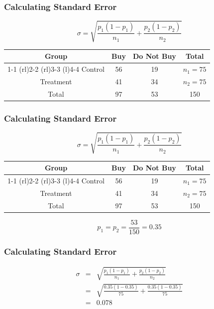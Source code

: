\documentclass{beamer}
\begin{document}
\begin{frame}
  \frametitle{Calculating Standard Error}
  \begin{equation*}
    \sigma = \sqrt{\frac{p_1(1-p_1)}{n_1} + \frac{p_2(1-p_2)}{n_2}}
  \end{equation*}
  \begin{table}
    \begin{tabular}{@{}cccc@{}}
      \toprule
      Group & Buy & Do Not Buy & Total \\
      \cmidrule(r){1-1} \cmidrule(rl){2-2} \cmidrule(rl){3-3}
      \cmidrule(l){4-4}
      Control & 56 & 19 & $n_1 = 75$ \\[0.3em]
      Treatment & 41 & 34 & $n_2 = 75$ \\[0.3em]
      Total & 97 & 53 & 150 \\
      \bottomrule
    \end{tabular}
  \end{table}
\end{frame}

\begin{frame}
  \frametitle{Calculating Standard Error}
  \begin{equation*}
    \sigma = \sqrt{\frac{p_1(1-p_1)}{n_1} + \frac{p_2(1-p_2)}{n_2}}
  \end{equation*}
  \begin{table}
    \begin{tabular}{@{}cccc@{}}
      \toprule
      Group & Buy & Do Not Buy & Total \\
      \cmidrule(r){1-1} \cmidrule(rl){2-2} \cmidrule(rl){3-3}
      \cmidrule(l){4-4}
      Control & 56 & 19 & $n_1 = 75$ \\[0.3em]
      Treatment & 41 & 34 & $n_2 = 75$ \\[0.3em]
      Total & 97 & 53 & 150 \\
      \bottomrule
    \end{tabular}
  \end{table}
  \begin{equation*}
    p_1 = p_2 = \frac{53}{150} = 0.35 
  \end{equation*}
\end{frame}

\begin{frame}
  \frametitle{Calculating Standard Error} 
  \begin{displaymath}
    \begin{array}{rcl}
      \sigma & = & \sqrt{\frac{p_1(1-p_1)}{n_1} +
      \frac{p_2(1-p_2)}{n_2}} \\[2em]
      & = & \sqrt{\frac{0.35(1-0.35)}{75} + \frac{0.35(1-0.35)}{75}}
      \\[2em]
      & = & 0.078
    \end{array}
  \end{displaymath} 
\end{frame}
\end{document}
